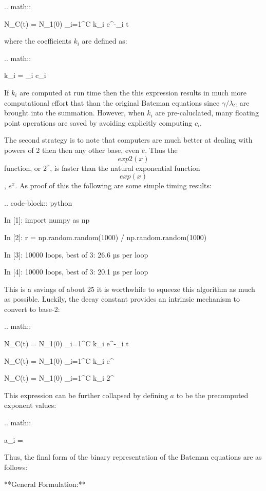 \documentclass{anstrans}
\begin{document}
.. math::

    N_C(t) = N_1(0) \sum_{i=1}^C k_{i} e^{-\lambda_i t}

where the coefficients $k_i$ are defined as:

.. math:: 

    k_i =  \lambda_i c_i

If $k_i$ are computed at run time then the this expression results in much more
computational effort that than the original Bateman equations since $\gamma/\lambda_C$ 
are brought into the summation. However, when $k_i$ are pre-caluclated, 
many floating point operations are saved by avoiding explicitly computing $c_i$.

The second strategy is to note that computers are much better at dealing with powers of
2 then then any other base, even $e$. Thus the $$exp2(x)$$ function, or $2^x$,
is faster than the natural exponential function $$exp(x)$$, $e^x$.  As proof of this
the following are some simple timing results:

.. code-block:: python 

    In [1]: import numpy as np

    In [2]: r = np.random.random(1000) / np.random.random(1000)

    In [3]: %
    10000 loops, best of 3: 26.6 µs per loop

    In [4]: %
    10000 loops, best of 3: 20.1 µs per loop

This is a savings of about 25%
it is worthwhile to squeeze this algorithm as much as possible.  Luckily, the decay constant
provides an intrinsic mechanism to convert to base-2:

.. math::

    N_C(t) = N_1(0) \sum_{i=1}^C k_{i} e^{-\lambda_i t}

    N_C(t) = N_1(0) \sum_{i=1}^C k_{i} e^{}

    N_C(t) = N_1(0) \sum_{i=1}^C k_{i} 2^{}

This expression can be further collapsed by defining $a$ to be the precomputed 
exponent values:

.. math:: 

    a_i = 

Thus, the final form of the binary representation of the Bateman equations are
as follows:

**General Formulation:** 
\end{document}
